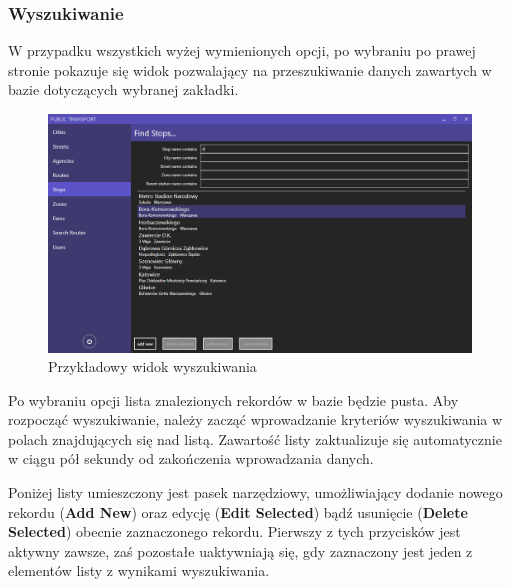 \documentclass[10pt,a4paper]{article}
\begin{document}
\subsubsection{Wyszukiwanie}
W przypadku wszystkich wyżej wymienionych opcji, po wybraniu po prawej stronie pokazuje się widok pozwalający na przeszukiwanie danych zawartych w bazie dotyczących wybranej zakładki.
\begin{figure}[H]
	\centering
	\includegraphics[width=15cm]{Resources/Images/13_filter_stops.png}
	\caption{Przykładowy widok wyszukiwania}
\end{figure}
Po wybraniu opcji lista znalezionych rekordów w bazie będzie pusta. Aby rozpocząć wyszukiwanie, należy zacząć wprowadzanie kryteriów wyszukiwania w polach znajdujących się nad listą. Zawartość listy zaktualizuje się automatycznie w ciągu pół sekundy od zakończenia wprowadzania danych.

Poniżej listy umieszczony jest pasek narzędziowy, umożliwiający dodanie nowego rekordu (\textbf{Add New}) oraz edycję (\textbf{Edit Selected}) bądź usunięcie (\textbf{Delete Selected}) obecnie zaznaczonego rekordu. Pierwszy z tych przycisków jest aktywny zawsze, zaś pozostałe uaktywniają się, gdy zaznaczony jest jeden z elementów listy z wynikami wyszukiwania.
\end{document}
